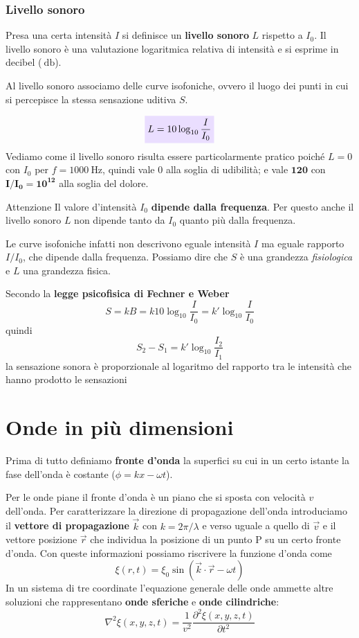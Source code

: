 \documentclass[x11names]{report}
\newcommand{\viola}[1]{\colorbox{yred}{$\displaystyle #1$}}
\begin{document}
	
	
	
	
	
	\subsubsection{Livello sonoro}
	Presa una certa intensità \(I\) si definisce un \textbf{livello sonoro} \(L\) rispetto a \(I_0\). Il livello sonoro è una valutazione logaritmica relativa di intensità e si esprime in decibel (\(\SI{}{\decibel}\)).
	
	Al livello sonoro associamo delle curve isofoniche, ovvero il luogo dei punti in cui si percepisce la stessa sensazione uditiva \(S\). 
	
	\begin{equation}\label{livello sonoro}
		\viola{L = 10\log_{10}{\frac{I}{I_0}}}
	\end{equation}
	Vediamo come il livello sonoro risulta essere particolarmente pratico poiché \(L = 0\) con \(I_0\) per \(f=1000\SI{}{\hertz}\), quindi vale 0 alla soglia di udibilità; e vale \(\boldsymbol{120}\) con \(\boldsymbol{I/I_0 = 10^{12}}\) alla soglia del dolore.
	
	\begin{es}{Attenzione}
		Il valore d'intensità \(I_0\) \textbf{dipende dalla frequenza}. Per questo anche il livello sonoro \(L\) non dipende tanto da \(I_0\) quanto più dalla frequenza. 
		
		Le curve isofoniche infatti non descrivono eguale intensità \(I\) ma eguale rapporto \(I/I_0\), che dipende dalla frequenza. Possiamo dire che \(S\) è una grandezza \textit{fisiologica} e \(L\) una grandezza fisica.
	\end{es}
	Secondo la \textbf{legge psicofisica di Fechner e Weber}
	\[ 
	S = kB = k10\log_10{\frac{I}{I_0}} = k'\log_10{\frac{I}{I_0}}
	\]
	quindi
	\begin{equation}
		S_2 - S_1 = k'\log_10{\frac{I_2}{I_1}}
	\end{equation}
	la sensazione sonora è proporzionale al logaritmo del rapporto tra le intensità che hanno prodotto le sensazioni
	
	
	\section{Onde in più dimensioni}	
	Prima di tutto definiamo \textbf{fronte d'onda} la superfici su cui in un certo istante la fase dell'onda è costante (\(\phi = kx -\omega t\)). 
	
	Per le onde piane il fronte d'onda è un piano che si sposta con velocità \(v\) dell'onda. Per caratterizzare la direzione di propagazione dell'onda introduciamo il \textbf{vettore di propagazione} \(\vec{k}\) con \(k = 2\pi/\lambda\) e verso uguale a quello di \(\vec{v}\) e il vettore posizione \(\vec{r}\) che individua la posizione di un punto P su un certo fronte d'onda. Con queste informazioni possiamo riscrivere la funzione d'onda come
	\[ 
	\xi(r,t) = \xi_0 \sin\left(\vec{k}\cdot \vec{r}- \omega t\right) 
	\]
	In un sistema di tre coordinate l'equazione generale delle onde ammette altre soluzioni che rappresentano \textbf{onde sferiche} e \textbf{onde cilindriche}: 
	\[ 
	\nabla^2\xi (x,y,z,t) = \frac{1}{v^2}\frac{\partial^2\xi (x,y,z,t)}{\partial t^2}
	\]
\end{document}
